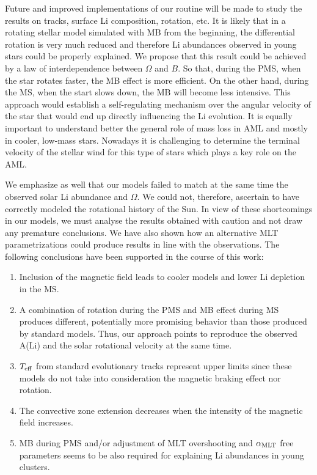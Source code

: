 \documentclass[fleqn,usenatbib]{mnras}
\begin{document}
Future and improved implementations of our routine will be made to study the results on tracks, surface Li composition, rotation, etc. It is likely that in a rotating stellar model simulated with MB from the beginning, the differential rotation is very much reduced and therefore Li abundances observed in young stars could be properly explained. We propose that this result could be achieved by a law of interdependence between $\Omega$ and $B$. So that, during the PMS, when the star rotates faster, the MB effect is more efficient. On the other hand, during the MS, when the start slows down, the MB will become less intensive. This approach would establish a self-regulating mechanism over the angular velocity of the star that would end up directly influencing the Li evolution. It is equally important to understand better the general role of mass loss in AML and mostly in cooler, low-mass stars. Nowadays it is challenging to determine the terminal velocity of the stellar wind for this type of stars which plays a key role on the AML.\par

We emphasize as well that our models failed to match at the same time the observed solar Li abundance and $\Omega$. We could not, therefore, ascertain to have correctly modeled the rotational history of the Sun. In view of these shortcomings in our models, we must analyse the results obtained with caution and not draw any premature conclusions. We have also shown how an alternative MLT parametrizations could produce results in line with the observations. The following conclusions have been supported in the course of this work:
\begin{enumerate}
    \item Inclusion of the magnetic field leads to cooler models and lower Li depletion in the MS.
    \item A combination of rotation during the PMS and MB effect during MS produces different, potentially more promising behavior than those produced by standard models. Thus, our approach points to reproduce the observed A(Li) and the solar rotational velocity at the same time.
    \item $T_{\mathrm{eff}}$ from standard evolutionary tracks represent upper limits since these models do not take into consideration the magnetic braking effect nor rotation.
    \item The convective zone extension decreases when the intensity of the magnetic field increases.
    \item MB during PMS and/or adjustment of MLT overshooting and $\alpha_{\mathrm{MLT}}$ free parameters seems to be also required for explaining Li abundances in young clusters.
\end{enumerate}
\end{document}
